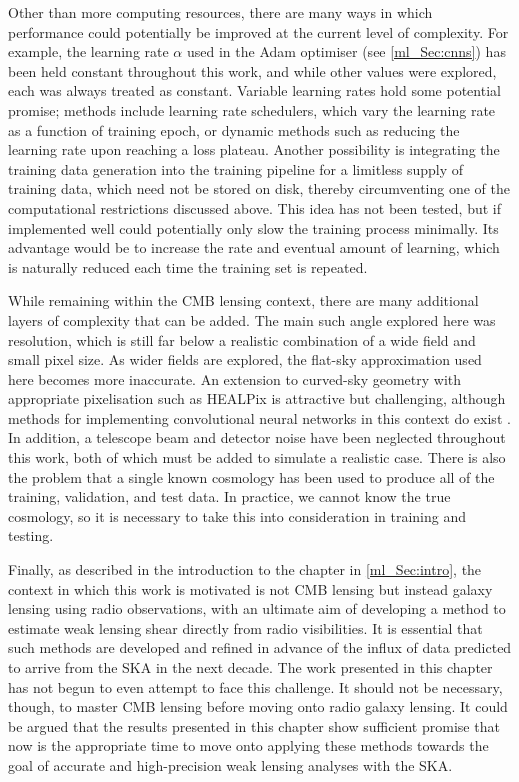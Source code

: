 Other than more computing resources, there are many ways in which performance could potentially be improved at the current level of complexity. For example, the learning rate $\alpha$ used in the Adam optimiser (see \autoref{ml_Sec:cnns}) has been held constant throughout this work, and while other values were explored, each was always treated as constant. Variable learning rates hold some potential promise; methods include learning rate schedulers, which vary the learning rate as a function of training epoch, or dynamic methods such as reducing the learning rate upon reaching a loss plateau. Another possibility is integrating the training data generation into the training pipeline for a limitless supply of training data, which need not be stored on disk, thereby circumventing one of the computational restrictions discussed above. This idea has not been tested, but if implemented well could potentially only slow the training process minimally. Its advantage would be to increase the rate and eventual amount of learning, which is naturally reduced each time the training set is repeated.

While remaining within the CMB lensing context, there are many additional layers of complexity that can be added. The main such angle explored here was resolution, which is still far below a realistic combination of a wide field and small pixel size. As wider fields are explored, the flat-sky approximation used here becomes more inaccurate. An extension to curved-sky geometry with appropriate pixelisation such as HEALPix is attractive but challenging, although methods for implementing convolutional neural networks in this context do exist \citep{Perraudin2019}. In addition, a telescope beam and detector noise have been neglected throughout this work, both of which must be added to simulate a realistic case. There is also the problem that a single known cosmology has been used to produce all of the training, validation, and test data. In practice, we cannot know the true cosmology, so it is necessary to take this into consideration in training and testing.

Finally, as described in the introduction to the chapter in \autoref{ml_Sec:intro}, the context in which this work is motivated is not CMB lensing but instead galaxy lensing using radio observations, with an ultimate aim of developing a method to estimate weak lensing shear directly from radio visibilities. It is essential that such methods are developed and refined in advance of the influx of data predicted to arrive from the SKA in the next decade. The work presented in this chapter has not begun to even attempt to face this challenge. It should not be necessary, though, to master CMB lensing before moving onto radio galaxy lensing. It could be argued that the results presented in this chapter show sufficient promise that now is the appropriate time to move onto applying these methods towards the goal of accurate and high-precision weak lensing analyses with the SKA.


% 
